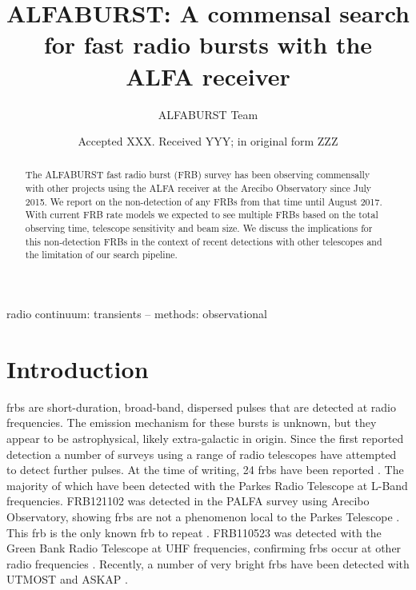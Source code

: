 \documentclass[a4paper,fleqn,usenatbib]{mnras}
\title[The ALFABURST Commensal FRB Survey]{ALFABURST: A commensal search for
fast radio bursts with the ALFA receiver}
\author[ALFABURST Team]{
ALFABURST Team
}
\date{Accepted XXX. Received YYY; in original form ZZZ}
\begin{document}
\label{firstpage}
\pagerange{\pageref{firstpage}--\pageref{lastpage}}
\maketitle

\begin{abstract}
The ALFABURST fast radio burst (FRB) survey has been observing commensally with
other projects using the ALFA receiver at the Arecibo Observatory since July
2015. We report on the non-detection of any FRBs from that time until August
2017. With current FRB rate models we expected to see multiple FRBs based on the
total observing time, telescope sensitivity and beam size. We discuss the
implications for this non-detection FRBs in the context of recent detections
with other telescopes and the limitation of our search pipeline.
\end{abstract}

\begin{keywords}
radio continuum: transients -- methods: observational
\end{keywords}


\section{Introduction}
\label{sec:intro}

\glspl{frb} are short-duration, broad-band, dispersed pulses that are detected
at radio frequencies. The emission mechanism for these bursts is unknown, but
they appear to be astrophysical, likely extra-galactic in origin. Since the
first reported detection \citep{2007Sci...318..777L} a number of surveys using a
range of radio telescopes have attempted to detect further pulses.  At the time
of writing, 24 \glspl{frb} have been reported \citep[for an up-to-date list,
see][]{2016PASA...33...45P}. The majority of which have been detected with the
Parkes Radio Telescope at L-Band frequencies. FRB121102 was detected in the
PALFA survey using Arecibo Observatory, showing \glspl{frb} are not a phenomenon
local to the Parkes Telescope \citep{2014ApJ...790..101S}. This \gls{frb} is the
only known \gls{frb} to repeat \citep{2016ApJ...833..177S}.  FRB110523 was
detected with the Green Bank Radio Telescope at UHF frequencies, confirming
\glspl{frb} occur at other radio frequencies \citep{2015Natur.528..523M}.
Recently, a number of very bright \glspl{frb} have been detected with UTMOST
\citep{2017MNRAS.468.3746C,atel10697} and ASKAP \citep{2017ApJ...841L..12B}.
\end{document}
